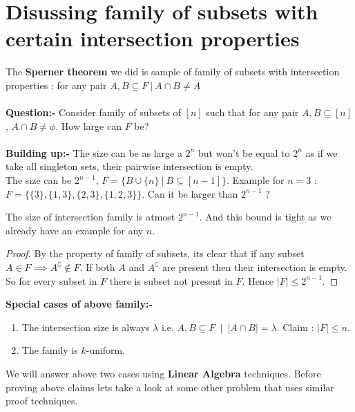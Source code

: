 \section{Disussing family of subsets with certain intersection properties}
The \textbf{Sperner theorem} we did is sample of family of subsets with intersection properties : for any pair $A,B \subseteq F ~|~ A\cap B \neq A$\\\\
\textbf{Question:-} Consider  family of subsets of $[n]$ such that for any pair $A,B \subseteq [n]$, $A \cap B \neq \phi$. How large can $F$ be?\\\\
\textbf{Building up:-} The size can be as large a $2^n$ but won't be equal to $2^n$ as if we take all singleton sets, their pairwise intersection is empty.\\ The size can be $2^{n-1}$, $F = \{ B \cup \{n\}~ | ~B\subseteq[n-1] \}$. Example for $n=3$ : $F=\{\{3\},\{1,3\},\{2,3\},\{1,2,3\}\}$. Can it be larger than $2^{n-1}$ ?
\begin{theorem} The size of intersection family is atmost $2^{n-1}$. And this bound is tight as we already have an example for any $n$.
\begin{proof}
By the property of family of subsets, its clear that if any subset $A \in F \implies {A}^\complement \notin F$. If both $A$ and $A^\complement$ are present then their intersection is empty. So for every subset in $F$ there is subset not present in $F$. Hence $|F| \le 2^{n-1}$.
\end{proof}
\end{theorem}
\textbf{Special cases of above family:-}
\begin{enumerate}
\item The intersection size is always $\lambda$ i.e. $A,B \subseteq F ~ \mid ~ |A \cap B|=\lambda$. Claim : $|F|\le n$.
\item The family is $k$-uniform.
\end{enumerate}
We will answer above two cases using \textbf{Linear Algebra} techniques. Before proving above claims lets take a look at some other problem that uses similar proof techniques.

